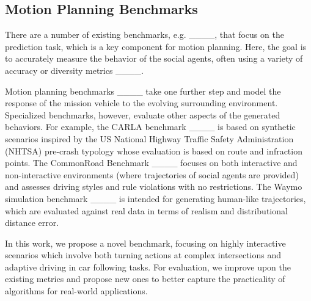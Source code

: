 \subsection{Motion Planning Benchmarks}
There are a number of existing benchmarks, e.g. ____, that focus on the prediction task, which is a key component for motion planning. Here, the goal is to accurately measure the behavior of the social agents, often using a variety of accuracy or diversity metrics ____. 

Motion planning benchmarks ____ take one further step and model the response of the mission vehicle to the evolving surrounding environment. Specialized benchmarks, however, evaluate other aspects of the generated behaviors. For example, the CARLA benchmark ____ is based on synthetic scenarios inspired by the US National Highway Traffic Safety Administration (NHTSA) pre-crash typology whose evaluation is based on route and infraction points. The CommonRoad Benchmark ____ focuses on both interactive and non-interactive environments (where trajectories of social agents are provided) and assesses driving styles and rule violations with no restrictions. The Waymo simulation benchmark ____ is intended for generating human-like trajectories, which are evaluated against real data in terms of realism and distributional distance error. 

In this work, we propose a novel benchmark, focusing on highly interactive scenarios which involve both turning actions at complex intersections and adaptive driving in car following tasks. For evaluation, we improve upon the existing metrics and propose new ones to better capture the practicality of algorithms for real-world applications.